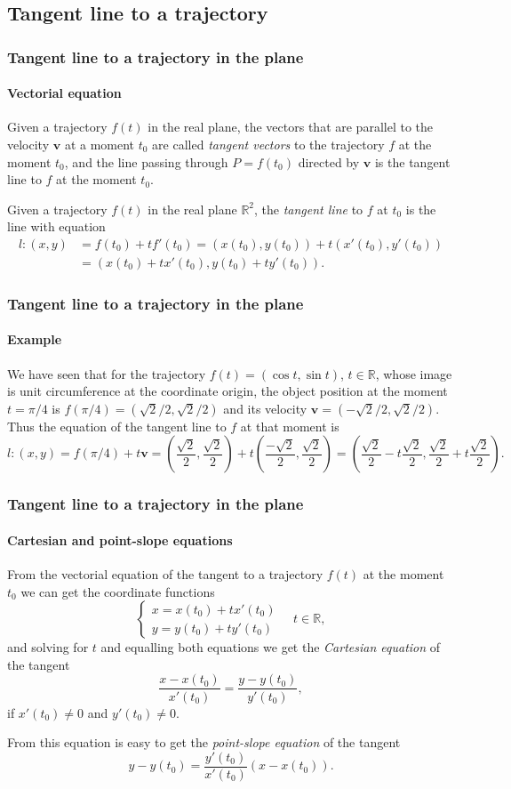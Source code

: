 \subsection{Tangent line to a trajectory}
\begin{frame}
\frametitle{Tangent line to a trajectory in the plane}
\framesubtitle{Vectorial equation}
Given a trajectory $f(t)$ in the real plane, the vectors that are parallel to the velocity $\mathbf{v}$ at a moment $t_0$ are called \emph{tangent vectors} to the trajectory $f$ at the moment $t_0$, and the line passing through $P=f(t_0)$ directed by $\mathbf{v}$ is the tangent line to $f$ at the moment $t_0$.

\begin{definition}
Given a trajectory $f(t)$ in the real plane $\mathbb{R}^2$, the \emph{tangent line} to $f$ at $t_0$ is the line with equation
\begin{align*}
l:(x,y) &= f(t_0)+tf'(t_0) = (x(t_0),y(t_0))+t(x'(t_0),y'(t_0))\\
& = (x(t_0)+tx'(t_0),y(t_0)+ty'(t_0)).
\end{align*}
\end{definition}
\end{frame}


\begin{frame}
\frametitle{Tangent line to a trajectory in the plane}
\framesubtitle{Example}
We have seen that for the trajectory $f(t) = (\cos t,\sin t)$, $t\in \mathbb{R}$, whose image is unit circumference at the coordinate origin, the object position at the moment $t=\pi/4$ is $f(\pi/4)=(\sqrt{2}/2,\sqrt{2}/2)$ and its velocity $\mathbf{v}=(-\sqrt{2}/2,\sqrt{2}/2)$. 
Thus the equation of the tangent line to $f$ at that moment is 
\[
l: (x,y) = f(\pi/4)+t\mathbf{v} =
\left(\frac{\sqrt{2}}{2},\frac{\sqrt{2}}{2}\right)+t\left(\frac{-\sqrt{2}}{2},\frac{\sqrt{2}}{2}\right) =
\left(\frac{\sqrt{2}}{2}-t\frac{\sqrt{2}}{2},\frac{\sqrt{2}}{2}+t\frac{\sqrt{2}}{2}\right).
\]
\end{frame}


\begin{frame}
\frametitle{Tangent line to a trajectory in the plane}
\framesubtitle{Cartesian and point-slope equations}
From the vectorial equation of the tangent to a trajectory $f(t)$ at the moment $t_0$ we can get the coordinate functions
\[
\begin{cases}
x=x(t_0)+tx'(t_0)\\
y=y(t_0)+ty'(t_0)
\end{cases}
\quad t\in \mathbb{R},
\]
and solving for $t$ and equalling both equations we get the \emph{Cartesian equation} of the tangent
\[
\frac{x-x(t_0)}{x'(t_0)}=\frac{y-y(t_0)}{y'(t_0)},
\]
if $x'(t_0)\neq 0$ and $y'(t_0)\neq 0$.

From this equation is easy to get the \emph{point-slope equation} of the tangent
\[
y-y(t_0)=\frac{y'(t_0)}{x'(t_0)}(x-x(t_0)).
\]
\end{frame}


